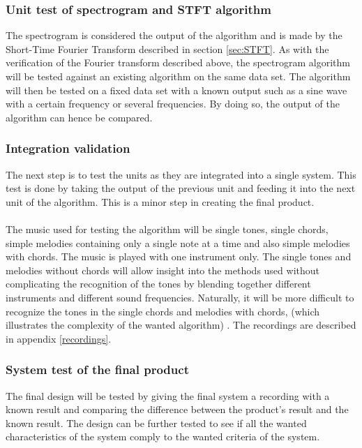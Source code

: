 \subsubsection{Unit test of spectrogram and STFT algorithm}
The spectrogram is considered the output of the algorithm and is made by the Short-Time Fourier Transform described in section \ref{sec:STFT}. As with the verification of the Fourier transform described above, the spectrogram algorithm will be tested against an existing algorithm on the same data set.
The algorithm will then be tested on a fixed data set with a known output such as a sine wave with a certain frequency or several frequencies. By doing so, the output of the algorithm can hence be compared.
\subsubsection{Integration validation}
The next step is to test the units as they are integrated into a single system. This test is done by taking the output of the previous unit and feeding it into the next unit of the algorithm. This is a minor step in creating the final product.
\\ \\
The music used for testing the algorithm will be single tones, single chords, simple melodies containing only a single note at a time and also simple melodies with chords. The music is played with one instrument only. The single tones and melodies without chords will allow insight into the methods used without complicating the recognition of the tones by blending together different instruments and different sound frequencies. Naturally, it will be more difficult to recognize the tones in the single chords and melodies with chords, (which illustrates the complexity of the wanted algorithm) . The recordings are described in appendix \ref{recordings}.

\subsubsection{System test of the final product}
The final design will be tested by giving the final system a recording with a known result and comparing the difference between the product's result and the known result. The design can be further tested to see if all the wanted characteristics of the system comply to the wanted criteria of the system.